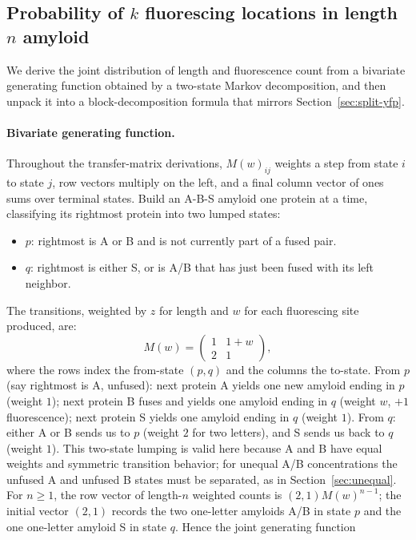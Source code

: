 \documentclass[11pt]{article}
\begin{document}
\subsection{Probability of $k$ fluorescing locations in length $n$ amyloid}\label{subsec:s3-dist}

We derive the joint distribution of length and fluorescence count from a bivariate generating function obtained by a two-state Markov decomposition, and then unpack it into a block-decomposition formula that mirrors Section~\ref{sec:split-yfp}.

\paragraph{Bivariate generating function.} Throughout the transfer-matrix derivations, $M(w)_{ij}$ weights a step from state $i$ to state $j$, row vectors multiply on the left, and a final column vector of ones sums over terminal states. Build an A-B-S amyloid one protein at a time, classifying its rightmost protein into two lumped states:
\begin{itemize}
\item \textbf{$p$}: rightmost is A or B and is not currently part of a fused pair.
\item \textbf{$q$}: rightmost is either S, or is A/B that has just been fused with its left neighbor.
\end{itemize}
The transitions, weighted by $z$ for length and $w$ for each fluorescing site produced, are:
\[
M(w) = \begin{pmatrix} 1 & 1 + w \\ 2 & 1 \end{pmatrix},
\]
where the rows index the from-state $(p, q)$ and the columns the to-state. From $p$ (say rightmost is A, unfused): next protein A yields one new amyloid ending in $p$ (weight $1$); next protein B fuses and yields one amyloid ending in $q$ (weight $w$, $+1$ fluorescence); next protein S yields one amyloid ending in $q$ (weight $1$). From $q$: either A or B sends us to $p$ (weight $2$ for two letters), and S sends us back to $q$ (weight $1$). This two-state lumping is valid here because A and B have equal weights and symmetric transition behavior; for unequal A/B concentrations the unfused A and unfused B states must be separated, as in Section~\ref{sec:unequal}. For $n \ge 1$, the row vector of length-$n$ weighted counts is $(2,1)M(w)^{n-1}$; the initial vector $(2,1)$ records the two one-letter amyloids A/B in state $p$ and the one one-letter amyloid S in state $q$. Hence the joint generating function
\end{document}
